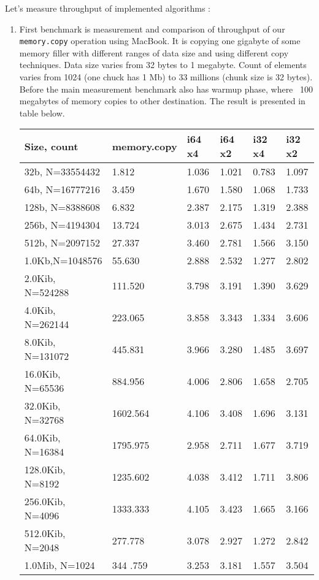 Let's measure throughput of implemented algorithms : 

\begin{enumerate}
  
\item First benchmark is measurement and comparison of throughput of our \texttt{memory.copy} operation using MacBook. 
      It is copying one gigabyte of some memory filler with different ranges of data size and using different copy techniques.  
      Data size varies from 32 bytes to 1 megabyte. 
      Count of elements varies from 1024 (one chuck has 1 Mb) to 33 millions (chunk size is 32 bytes).
      Before the main measurement benchmark also has warmup phase, where ~100 megabytes of memory copies to other destination.
      The result is presented in table below. 

\small
\begin{table}[]
\hspace{2cm}
\begin{tabular}{|l|l|l|l|l|l|} \hline

 Size, count      & memory.copy & i64 x4 & i64 x2 & i32 x4 & i32 x2 \\ \hline
 32b, N=33554432  & 1.812       & 1.036  & 1.021  & 0.783  & 1.097  \\ \hline
 64b, N=16777216  & 3.459       & 1.670  & 1.580  & 1.068  & 1.733  \\ \hline
 128b, N=8388608  & 6.832       & 2.387  & 2.175  & 1.319  & 2.388  \\ \hline
 256b, N=4194304  & 13.724      & 3.013  & 2.675  & 1.434  & 2.731  \\ \hline
 512b, N=2097152  & 27.337      & 3.460  & 2.781  & 1.566  & 3.150  \\ \hline
 1.0Kb,N=1048576  & 55.630      & 2.888  & 2.532  & 1.277  & 2.802  \\ \hline
 2.0Kib, N=524288 & 111.520     & 3.798  & 3.191  & 1.390  & 3.629  \\ \hline
 4.0Kib, N=262144 & 223.065     & 3.858  & 3.343  & 1.334  & 3.606  \\ \hline
 8.0Kib, N=131072 & 445.831     & 3.966  & 3.280  & 1.485  & 3.697  \\ \hline
 16.0Kib, N=65536 & 884.956     & 4.006  & 2.806  & 1.658  & 2.705  \\ \hline
 32.0Kib, N=32768 & 1602.564    & 4.106  & 3.408  & 1.696  & 3.131  \\ \hline
 64.0Kib, N=16384 & 1795.975    & 2.958  & 2.711  & 1.677  & 3.719  \\ \hline
 128.0Kib, N=8192 & 1235.602    & 4.038  & 3.412  & 1.711  & 3.806  \\ \hline
 256.0Kib, N=4096 & 1333.333    & 4.105  & 3.423  & 1.665  & 3.166  \\ \hline
 512.0Kib, N=2048 & 277.778     & 3.078  & 2.927  & 1.272  & 2.842  \\ \hline
 1.0Mib, N=1024   & 344 .759    & 3.253  & 3.181  & 1.557  & 3.504  \\ \hline


\end{tabular}
\end{table}
\end{enumerate}
